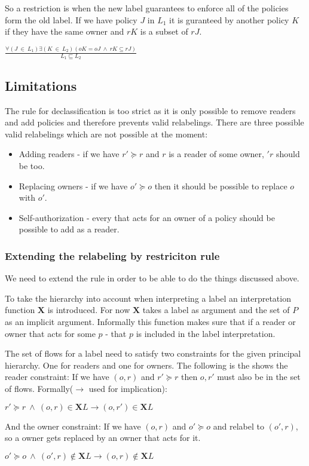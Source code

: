 So a restriction is when the new label guarantees to enforce all of the policies form the old label.
If we have policy $J$ in $L_1$ it is guranteed by another policy $K$ if they have the same owner and $rK$ is a subset of $rJ$.
\begin{definition}
$\frac{\forall (J \ \in \ L_1) \exists (K \ \in \ L_2)(oK = oJ \ \wedge \ rK \subseteq rJ)}{L_1 \sqsubseteq L_2}$
\end{definition}

\subsection{Limitations}
The rule for declassification is too strict as it is only possible to remove readers and add policies and therefore prevents valid relabelings.
There are three possible valid relabelings which are not possible at the moment:
\begin{itemize}
\item Adding readers - if we have $r' \succeq r$ and $r$ is a reader of some owner, $'r$ should be too.
\item Replacing owners - if we have $o' \succeq o$ then it should be possible to replace $o$ with $o'$.
\item Self-authorization - every \principal{} that acts for an owner of a policy should be possible to add as a reader.
\end{itemize}

\subsubsection{Extending the relabeling by restriciton rule}
We need to extend the rule in order to be able to do the things discussed above.

To take the \principal{} hierarchy into account when interpreting a label an interpretation function $\textbf{X}$ is introduced.
For now $\textbf{X}$ takes a label as argument and the set of \principals{} $P$ as an implicit argument.
Informally this function makes sure that if a reader or owner that acts for some \principal{} $p$ - that $p$ is included in the label interpretation.


The set of flows for a label need to satisfy two constraints for the given principal hierarchy.
One for readers and one for owners.
The following is the shows the reader constraint:
If we have $(o,r)$ and $r' \succeq r$ then $o,r'$ must also be in the set of flows.
Formally($\rightarrow$ used for implication):
\begin{center}
  $r' \succeq r \ \wedge \ (o,r) \in \textbf{X}L \rightarrow (o,r') \in \textbf{X}L$
\end{center}
And the owner constraint:
If we have $(o,r)$ and $o' \succeq o$ and relabel to $(o',r)$, so a owner gets replaced by an owner that acts for it.
\begin{center}
  $o' \succeq o \ \wedge \ (o',r) \notin \textbf{X}L \rightarrow (o,r) \notin \textbf{X}L$
\end{center}


